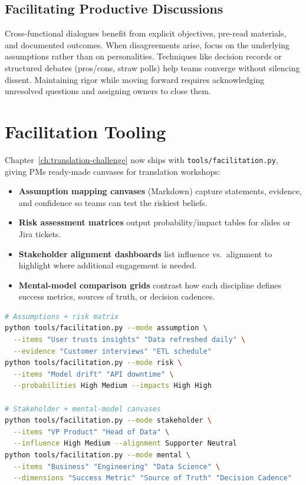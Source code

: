 \subsection{Facilitating Productive Discussions}
Cross-functional dialogues benefit from explicit objectives, pre-read materials, and documented outcomes. When disagreements arise, focus on the underlying assumptions rather than on personalities. Techniques like decision records or structured debates (pros/cons, straw polls) help teams converge without silencing dissent. Maintaining rigor while moving forward requires acknowledging unresolved questions and assigning owners to close them.

\section{Facilitation Tooling}
\label{sec:facilitation-tools}

Chapter~\ref{ch:translation-challenge} now ships with \texttt{tools/facilitation.py}, giving PMs ready-made canvases for translation workshops:
\begin{itemize}
    \item \textbf{Assumption mapping canvases} (Markdown) capture statements, evidence, and confidence so teams can test the riskiest beliefs.
    \item \textbf{Risk assessment matrices} output probability/impact tables for slides or Jira tickets.
    \item \textbf{Stakeholder alignment dashboards} list influence vs.\ alignment to highlight where additional engagement is needed.
    \item \textbf{Mental-model comparison grids} contrast how each discipline defines success metrics, sources of truth, or decision cadences.
\end{itemize}

\begin{lstlisting}[language=bash,caption={Generating facilitation assets for translation workshops (verified with Python 3.13 and the repo's tooling).}]
# Assumptions + risk matrix
python tools/facilitation.py --mode assumption \
  --items "User trusts insights" "Data refreshed daily" \
  --evidence "Customer interviews" "ETL schedule"
python tools/facilitation.py --mode risk \
  --items "Model drift" "API downtime" \
  --probabilities High Medium --impacts High High

# Stakeholder + mental-model canvases
python tools/facilitation.py --mode stakeholder \
  --items "VP Product" "Head of Data" \
  --influence High Medium --alignment Supporter Neutral
python tools/facilitation.py --mode mental \
  --items "Business" "Engineering" "Data Science" \
  --dimensions "Success Metric" "Source of Truth" "Decision Cadence"
\end{lstlisting}

